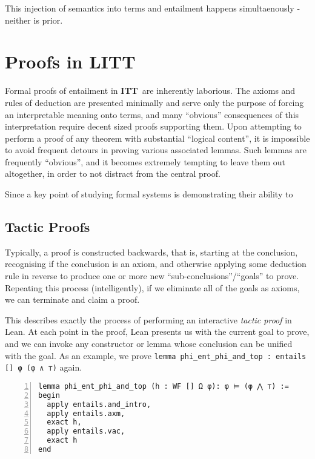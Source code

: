 \documentclass[12pt,leqno]{article}
\def\lc{\lstinline}
\newcommand{\ITT}{\textbf{ITT}}
\theoremstyle{example}
\numberwithin{equation}{section}
\begin{document}
This injection of semantics into terms and entailment happens simultaenously - neither is prior. %

\section{Proofs in LITT}

Formal proofs of entailment in \ITT~are inherently laborious. The axioms and rules of deduction are presented minimally and serve only the purpose of forcing an interpretable meaning onto terms, and many ``obvious'' consequences of this interpretation require decent sized proofs supporting them. Upon attempting to perform a proof of any theorem with substantial ``logical content'', it is impossible to avoid frequent detours in proving various associated lemmas. Such lemmas are frequently ``obvious'', and it becomes extremely tempting to leave them out altogether, in order to not distract from the central proof.

Since a key point of studying formal systems is demonstrating their ability to %

\subsection{Tactic Proofs}\label{section:tacticProofs}

Typically, a proof is constructed backwards, that is, starting at the conclusion, recognising if the conclusion is an axiom, and otherwise applying some deduction rule in reverse to produce one or more new ``sub-conclusions''/``goals'' to prove. Repeating this process (intelligently), if we eliminate all of the goals as axioms, we can terminate and claim a proof.

This describes exactly the process of performing an interactive \emph{tactic proof} in Lean. At each point in the proof, Lean presents us with the current goal to prove, and we can invoke any constructor or lemma whose conclusion can be unified with the goal. As an example, we prove \lc{lemma phi_ent_phi_and_top : entails [] φ (φ ∧ ⊤)} again.

\begin{lstlisting}[numbers=left, stepnumber=1, frame=single]
lemma phi_ent_phi_and_top (h : WF [] Ω φ): φ ⊨ (φ ⋀ ⊤) :=
begin
  apply entails.and_intro,
  apply entails.axm,
  exact h,
  apply entails.vac,
  exact h
end
\end{lstlisting}
\end{document}
